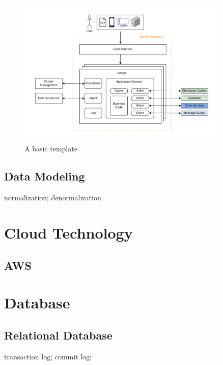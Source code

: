 \documentclass[letterpaper, oneside]{book}
\theoremstyle{definition}
\theoremstyle{remark}
\begin{document}
\begin{figure}[h]
    \centering
    \includegraphics[width=0.90\textwidth]{system_design_basic_template.png}
    \caption{A basic template}
    \label{fig:basic_template}
\end{figure}


\chapter{Data Modeling}
normalization; denormalization


\part{Cloud Technology}

\chapter{AWS}


\part{Database}

\chapter{Relational Database}
transaction log; commit log;
\end{document}
